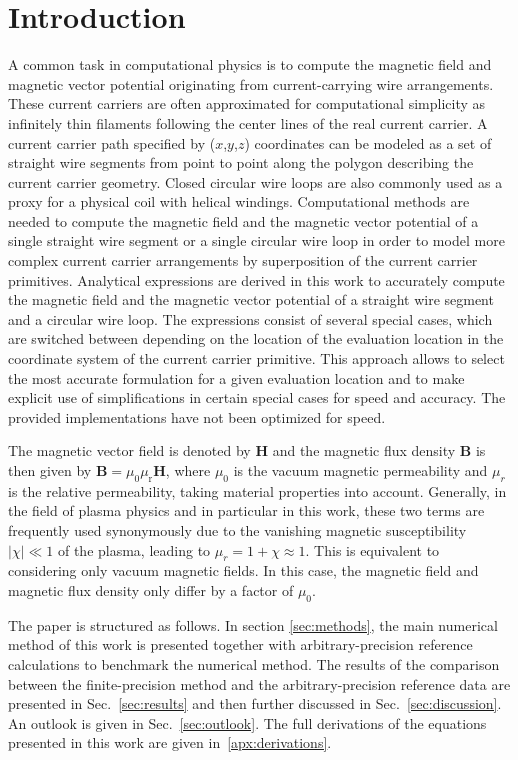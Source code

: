 \section{Introduction}
\label{sec:introduction}
A common task in computational physics is to compute the magnetic field and magnetic vector potential
originating from current-carrying wire arrangements.
These current carriers are often approximated for computational simplicity as infinitely thin filaments
following the center lines of the real current carrier.
A current carrier path specified by ($x$,$y$,$z$) coordinates
can be modeled as a set of straight wire segments from point to point along the polygon describing the current carrier geometry.
Closed circular wire loops are also commonly used as a proxy for a physical coil with helical windings.
Computational methods are needed to compute the magnetic field and the magnetic vector potential
of a single straight wire segment or a single circular wire loop
in order to model more complex current carrier arrangements
by superposition of the current carrier primitives.
Analytical expressions are derived in this work to accurately compute
the magnetic field and the magnetic vector potential of a straight wire segment
and a circular wire loop. The expressions consist of several special cases,
which are switched between depending on the location of the evaluation location
in the coordinate system of the current carrier primitive.
This approach allows to select the most accurate formulation
for a given evaluation location and to make explicit use of simplifications
in certain special cases for speed and accuracy.
The provided implementations have not been optimized for speed.

The magnetic vector field is denoted by $\mathbf{H}$ and
the magnetic flux density $\mathbf{B}$ is then given by $\mathbf{B} = \mu_0 \mu_\mathrm{r} \mathbf{H}$,
where $\mu_0$ is the vacuum magnetic permeability
and $\mu_r$ is the relative permeability, taking material properties into account.
Generally, in the field of plasma physics and in particular in this work,
these two terms are frequently used synonymously
due to the vanishing magnetic susceptibility $|\chi| \ll 1$ of the plasma,
leading to $\mu_r = 1+\chi \approx 1$.
This is equivalent to considering only vacuum magnetic fields.
In this case, the magnetic field and magnetic flux density only differ by a factor of $\mu_0$.

The paper is structured as follows.
In section \ref{sec:methods}, the main numerical method of this work is presented
together with arbitrary-precision reference calculations to benchmark the numerical method.
The results of the comparison between the finite-precision method
and the arbitrary-precision reference data are presented in Sec.~\ref{sec:results}
and then further discussed in Sec.~\ref{sec:discussion}.
An outlook is given in Sec.~\ref{sec:outlook}.
The full derivations of the equations presented in this work are given in~\ref{apx:derivations}.
